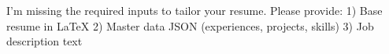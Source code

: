 I’m missing the required inputs to tailor your resume. Please provide:
1) Base resume in LaTeX
2) Master data JSON (experiences, projects, skills)
3) Job description text